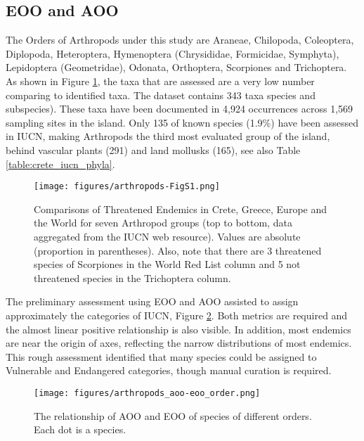     \subsection{EOO and AOO}
    \label{subsec:arthropods-sampling}

The Orders of Arthropods under this study are Araneae, Chilopoda, Coleoptera,
Diplopoda, Heteroptera, Hymenoptera (Chrysididae, Formicidae, Symphyta),
Lepidoptera (Geometridae), Odonata, Orthoptera, Scorpiones and Trichoptera.
As shown in Figure \ref{fig:arthropods-figS1}, the taxa that are assessed are 
a very low number comparing to identified taxa. The dataset contains 343 taxa species and subspecies).
These taxa have been documented in 4,924 occurrences across 1,569 sampling sites in the island.
Only 135 of known species (1.9\%) \textcite{legakis2018} have been assessed in IUCN,
making Arthropods the third most evaluated group of the
island, behind vascular plants (291) and land mollusks (165), see also Table \ref{table:crete_iucn_phyla}.

    \begin{figure}[htp!]
      \centering
      \texttt{[image: figures/arthropods-FigS1.png]}
      \caption[Comparisons of Threatened Endemics in Crete, Greece, Europe and the World]{Comparisons of Threatened Endemics in Crete, Greece, Europe and the World for seven Arthropod groups (top to bottom, data aggregated from the IUCN web resource). Values are absolute (proportion in parentheses). Also, note that there are 3 threatened species of Scorpiones in the World Red List column and 5 not threatened species in the Trichoptera column.}
      \label{fig:arthropods-figS1}
   \end{figure}

The preliminary assessment using EOO and AOO assisted to assign approximately the 
categories of IUCN, Figure \ref{fig:arthropods-eoo-aoo}.
Both metrics are required and the almost linear positive relationship is also visible. 
In addition, most endemics are near the origin of axes, reflecting the narrow 
distributions of most endemics.
This rough assessment 
identified that many species could be assigned to Vulnerable and Endangered categories, though 
manual curation is required. 

   \begin{figure}[htb!]
      \centering
      \texttt{[image: figures/arthropods\_aoo-eoo\_order.png]}
      \caption[AOO, EOO relationship per order]{The relationship of AOO and EOO of species of different orders. Each dot is a species. }
      \label{fig:arthropods-eoo-aoo}
   \end{figure}


